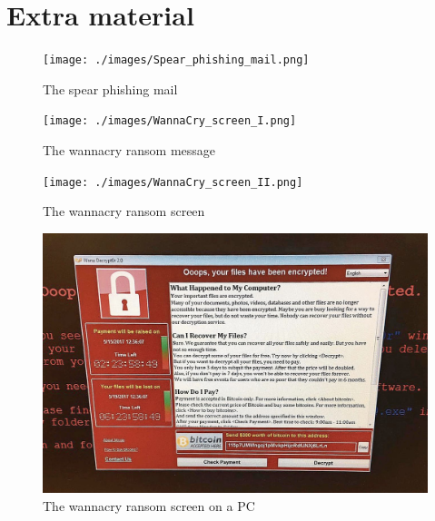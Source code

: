 \chapter{Extra material}

\begin{figure}[h!p]
    \centering
    \texttt{[image: ./images/Spear\_phishing\_mail.png]}
    \caption{The spear phishing mail}
    \label{img:Phishing_Mail}
\end{figure}

\begin{figure}[h!p]
    \centering
    \texttt{[image: ./images/WannaCry\_screen\_I.png]}
    \caption{The wannacry ransom message}
    \label{img:WannaCry_Screen_I}
\end{figure}

\begin{figure}[h!p]
    \centering
    \texttt{[image: ./images/WannaCry\_screen\_II.png]}
    \caption{The wannacry ransom screen}
    \label{img:WannaCry_Screen_II}
\end{figure}

\begin{figure}[h!p]
    \centering
    \includegraphics[width=\textwidth]{./images/WannaCry_screen_III.jpeg}
    \caption{The wannacry ransom screen on a PC}
    \label{img:WannaCry_Screen_III}
\end{figure}